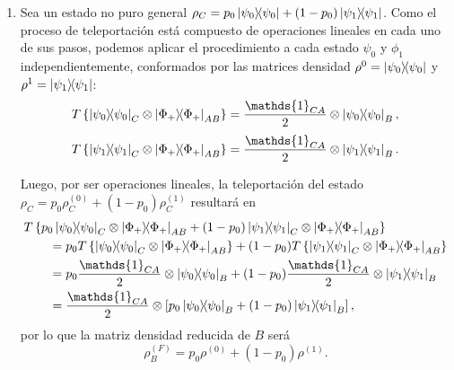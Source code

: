 \documentclass{scrartcl}
\DeclareRobustCommand{\[}{\begin{equation}}
\DeclareRobustCommand{\]}{\end{equation}}
\begin{document}
\begin{enumerate}
    \begin{enumerate}
        \item Sea un estado no puro general $\rho_C = p_0 \dyad{\psi_0}{\psi_0} + (1 - p_0) \dyad{\psi_1}{\psi_1}$. Como el proceso de teleportación está compuesto de operaciones lineales en cada uno de sus pasos, podemos aplicar el procedimiento a cada estado $\psi_0$ y $\phi_1$ independientemente, conformados por las matrices densidad $\rho^{0} = \dyad{\psi_0}{\psi_0}$ y $\rho^{1} = \dyad{\psi_1}{\psi_1}$:
        \[ T\left\{ \dyad{\psi_0}{\psi_0}_C \otimes \dyad{\Phi_+}{\Phi_+}_{AB} \right\} = \frac{\mathds{1}_{CA}}{2} \otimes \dyad{\psi_0}{\psi_0}_{B}, \]
        \[ T\left\{ \dyad{\psi_1}{\psi_1}_C \otimes \dyad{\Phi_+}{\Phi_+}_{AB} \right\} = \frac{\mathds{1}_{CA}}{2} \otimes \dyad{\psi_1}{\psi_1}_{B}. \]
        
        Luego, por ser operaciones lineales, la teleportación del estado $\rho_C = p_0 \rho^{(0)}_C + (1 - p_0) \rho^{(1)}_C$ resultará en
        \begin{align}
            &T\left\{ p_0 \dyad{\psi_0}{\psi_0}_C \otimes \dyad{\Phi_+}{\Phi_+}_{AB} + (1 - p_0) \dyad{\psi_1}{\psi_1}_C \otimes \dyad{\Phi_+}{\Phi_+}_{AB} \right\} \\
                &\quad \quad = p_0 T\left\{ \dyad{\psi_0}{\psi_0}_C \otimes \dyad{\Phi_+}{\Phi_+}_{AB} \right\} + (1 - p_0) T\left\{ \dyad{\psi_1}{\psi_1}_C \otimes \dyad{\Phi_+}{\Phi_+}_{AB} \right\} \\
                &\quad \quad = p_0 \frac{\mathds{1}_{CA}}{2} \otimes \dyad{\psi_0}{\psi_0}_{B} + (1 - p_0) \frac{\mathds{1}_{CA}}{2} \otimes \dyad{\psi_1}{\psi_1}_{B} \\
                &\quad \quad = \frac{\mathds{1}_{CA}}{2} \otimes \left[ p_0 \dyad{\psi_0}{\psi_0}_{B} + (1 - p_0) \dyad{\psi_1}{\psi_1}_{B} \right],
        \end{align}
        por lo que la matriz densidad reducida de $B$ será
        \[ \rho^{(F)}_B = p_0 \rho^{(0)} + (1 - p_0) \rho^{(1)}. \]
        

\end{enumerate}
\end{enumerate}
\end{document}
